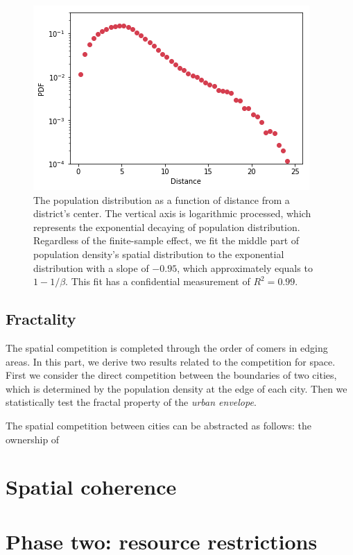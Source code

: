 \documentclass[aps,prl]{revtex4-1}
\begin{document}
\begin{figure}[ht]
\centering
\includegraphics[width=0.9\linewidth]{fig/clark.png}
\caption{The population distribution as a function of distance from a district's center. The vertical axis is logarithmic processed, which represents the exponential decaying of population distribution. Regardless of the finite-sample effect, we fit the middle part of population density's spatial distribution to the exponential distribution with a slope of $-0.95$, which approximately equals to $1-1/\beta.$ This fit has a confidential measurement of $R^2=0.99$.}
\label{fig:clark}
\end{figure}

\subsection{Fractality}

The spatial competition is completed through the order of comers in edging areas. In this part, we derive two results related to the competition for space. First we consider the direct competition between the boundaries of two cities, which is determined by the population density at the edge of each city. Then we statistically test the fractal property of the \emph{urban envelope}. 

The spatial competition between cities can be abstracted as follows: the ownership of 

\section{Spatial coherence}

\section{Phase two: resource restrictions}
\end{document}
